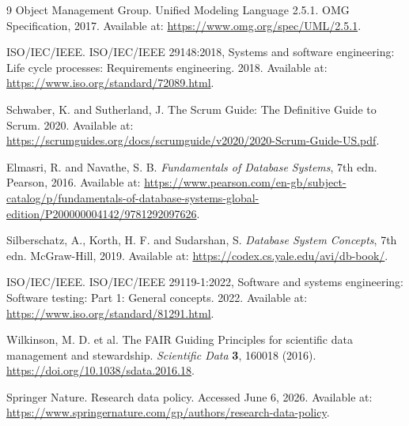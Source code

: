\documentclass[11pt,a4paper]{article}
\begin{document}
\begin{thebibliography}{9}
Object Management Group. Unified Modeling Language 2.5.1. OMG Specification, 2017. Available at: \url{https://www.omg.org/spec/UML/2.5.1}.

ISO/IEC/IEEE. ISO/IEC/IEEE 29148:2018, Systems and software engineering: Life cycle processes: Requirements engineering. 2018. Available at: \url{https://www.iso.org/standard/72089.html}.

Schwaber, K. and Sutherland, J. The Scrum Guide: The Definitive Guide to Scrum. 2020. Available at: \url{https://scrumguides.org/docs/scrumguide/v2020/2020-Scrum-Guide-US.pdf}.

Elmasri, R. and Navathe, S. B. \textit{Fundamentals of Database Systems}, 7th edn. Pearson, 2016. Available at: \url{https://www.pearson.com/en-gb/subject-catalog/p/fundamentals-of-database-systems-global-edition/P200000004142/9781292097626}.

Silberschatz, A., Korth, H. F. and Sudarshan, S. \textit{Database System Concepts}, 7th edn. McGraw-Hill, 2019. Available at: \url{https://codex.cs.yale.edu/avi/db-book/}.

ISO/IEC/IEEE. ISO/IEC/IEEE 29119-1:2022, Software and systems engineering: Software testing: Part 1: General concepts. 2022. Available at: \url{https://www.iso.org/standard/81291.html}.

Wilkinson, M. D. et al. The FAIR Guiding Principles for scientific data management and stewardship. \textit{Scientific Data} \textbf{3}, 160018 (2016). \url{https://doi.org/10.1038/sdata.2016.18}.

Springer Nature. Research data policy. Accessed June 6, 2026. Available at: \url{https://www.springernature.com/gp/authors/research-data-policy}.
\end{thebibliography}
\end{document}
